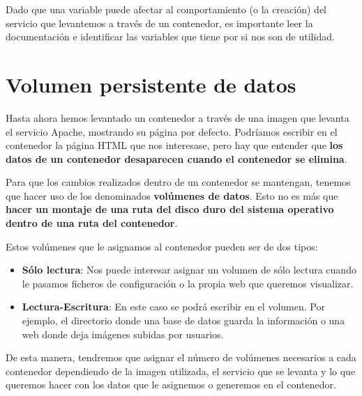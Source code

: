 Dado que una variable puede afectar al comportamiento (o la creación) del servicio que levantemos a través de un contenedor, es importante leer la documentación e identificar las variables que tiene por si nos son de utilidad.





\hypertarget{volumen_persistente_datos}{}
\section{Volumen persistente de datos}
Hasta ahora hemos levantado un contenedor a través de una imagen que levanta el servicio Apache, mostrando su página por defecto. Podríamos escribir en el contenedor la página HTML que nos interesase, pero hay que entender que \textbf{los datos de un contenedor desaparecen cuando el contenedor se elimina}.

Para que los cambios realizados dentro de un contenedor se mantengan, tenemos que hacer uso de los denominados \textbf{volúmenes de datos}. Esto no es más que \textbf{hacer un montaje de una ruta del disco duro del sistema operativo dentro de una ruta del contenedor}.


Estos volúmenes que le asignamos al contenedor pueden ser de dos tipos:
\begin{itemize}
    \item \textbf{Sólo lectura}: Nos puede interesar asignar un volumen de sólo lectura cuando le pasamos ficheros de configuración o la propia web que queremos visualizar.
    \item \textbf{Lectura-Escritura}: En este caso se podrá escribir en el volumen. Por ejemplo, el directorio donde una base de datos guarda la información o una web donde deja imágenes subidas por usuarios.
\end{itemize}

De esta manera, tendremos que asignar el número de volúmenes necesarios a cada contenedor dependiendo de la imagen utilizada, el servicio que se levanta y lo que queremos hacer con los datos que le asignemos o generemos en el contenedor.

